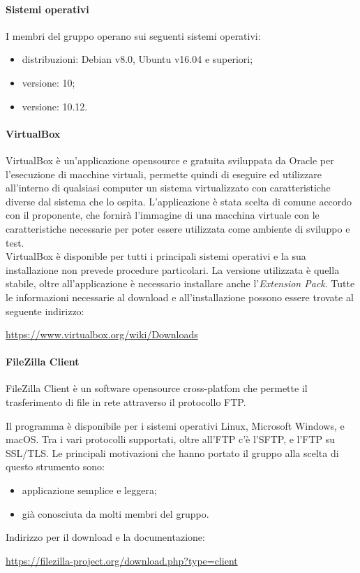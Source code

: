 	\paragraph{Sistemi operativi}
	I membri del gruppo operano sui seguenti sistemi operativi:
	\begin{itemize}
		\item {} distribuzioni: Debian v8.0, Ubuntu v16.04 e superiori;
		\item {} versione: 10;
		\item {} versione: 10.12.
	\end{itemize}
	\paragraph{VirtualBox}
	VirtualBox è un'applicazione opensource e gratuita sviluppata da Oracle per l'esecuzione di macchine virtuali,
	permette quindi di eseguire ed utilizzare all'interno di qualsiasi computer un sistema virtualizzato con caratteristiche diverse dal sistema che lo ospita.
	L'applicazione è stata scelta di comune accordo con il proponente, che fornirà l'immagine di una macchina virtuale con le caratteristiche necessarie per poter essere utilizzata come ambiente di sviluppo e test.\\
	VirtualBox è disponible per tutti i principali sistemi operativi e la sua installazione non prevede procedure particolari. La versione utilizzata è quella stabile, oltre all'applicazione è necessario installare anche l'\textit{Extension Pack}. Tutte le informazioni necessarie al download e all'installazione possono essere trovate al seguente indirizzo:\\
	\begin{center}
		\url{https://www.virtualbox.org/wiki/Downloads}
	\end{center}
	\paragraph{FileZilla Client}
	FileZilla Client è un software opensource cross-platfom che permette il trasferimento di file in rete attraverso il protocollo FTP.
	
	Il programma è disponibile per i sistemi operativi Linux, Microsoft Windows, e macOS. Tra i vari protocolli supportati, oltre all'FTP c'è l'SFTP, e l'FTP su SSL/TLS.
	Le principali motivazioni che hanno portato il gruppo alla scelta di questo strumento sono:
	\begin{itemize}
		\item applicazione semplice e leggera;
		\item già conosciuta da molti membri del gruppo.
	\end{itemize}
	Indirizzo per il download e la documentazione:
	\begin{center}
		\url{https://filezilla-project.org/download.php?type=client}
	\end{center}

